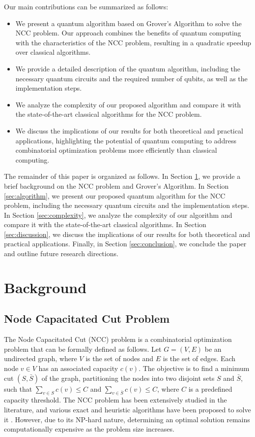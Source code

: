 Our main contributions can be summarized as follows:

\begin{itemize}
    \item We present a quantum algorithm based on Grover's Algorithm to solve the NCC problem. Our approach combines the benefits of quantum computing with the characteristics of the NCC problem, resulting in a quadratic speedup over classical algorithms.
    \item We provide a detailed description of the quantum algorithm, including the necessary quantum circuits and the required number of qubits, as well as the implementation steps.
    \item We analyze the complexity of our proposed algorithm and compare it with the state-of-the-art classical algorithms for the NCC problem.
    \item We discuss the implications of our results for both theoretical and practical applications, highlighting the potential of quantum computing to address combinatorial optimization problems more efficiently than classical computing.
\end{itemize}

The remainder of this paper is organized as follows. In Section \ref{sec:background}, we provide a brief background on the NCC problem and Grover's Algorithm. In Section \ref{sec:algorithm}, we present our proposed quantum algorithm for the NCC problem, including the necessary quantum circuits and the implementation steps. In Section \ref{sec:complexity}, we analyze the complexity of our algorithm and compare it with the state-of-the-art classical algorithms. In Section \ref{sec:discussion}, we discuss the implications of our results for both theoretical and practical applications. Finally, in Section \ref{sec:conclusion}, we conclude the paper and outline future research directions.

\section{Background} \label{sec:background}

\subsection{Node Capacitated Cut Problem}

The Node Capacitated Cut (NCC) problem is a combinatorial optimization problem that can be formally defined as follows. Let $G=(V, E)$ be an undirected graph, where $V$ is the set of nodes and $E$ is the set of edges. Each node $v \in V$ has an associated capacity $c(v)$. The objective is to find a minimum cut $(S, \bar{S})$ of the graph, partitioning the nodes into two disjoint sets $S$ and $\bar{S}$, such that $\sum_{v \in S} c(v) \leq C$ and $\sum_{v \in \bar{S}} c(v) \leq C$, where $C$ is a predefined capacity threshold. The NCC problem has been extensively studied in the literature, and various exact and heuristic algorithms have been proposed to solve it \cite{NCC_algorithms}. However, due to its NP-hard nature, determining an optimal solution remains computationally expensive as the problem size increases.

